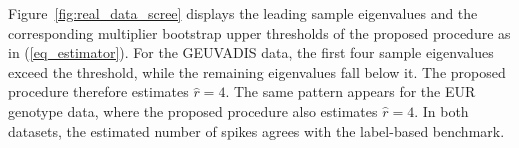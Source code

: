 \documentclass[12pt]{article}
\theoremstyle{plain}
\numberwithin{equation}{section}
\begin{document}
				Figure~\ref{fig:real_data_scree} displays the leading sample eigenvalues and the corresponding multiplier bootstrap upper thresholds of the proposed procedure as in (\ref{eq_estimator}). For the GEUVADIS data, the first four sample eigenvalues exceed the threshold, while the remaining eigenvalues fall below it. The proposed procedure therefore estimates $\widehat r=4$. The same pattern appears for the EUR genotype data, where the proposed procedure also estimates $\widehat r=4$. In both datasets, the estimated number of spikes agrees with the label-based benchmark.
				
				
\end{document}
